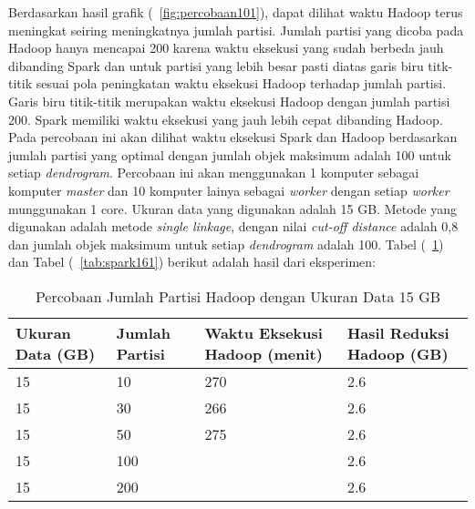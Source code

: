 Berdasarkan hasil grafik (~\ref{fig:percobaan101}), dapat dilihat waktu Hadoop terus meningkat seiring meningkatnya jumlah partisi. Jumlah partisi yang dicoba pada Hadoop hanya mencapai 200 karena waktu eksekusi yang sudah berbeda jauh dibanding Spark dan untuk partisi yang lebih besar pasti diatas garis biru titk-titik sesuai pola peningkatan waktu eksekusi Hadoop terhadap jumlah partisi. Garis biru titik-titik merupakan waktu eksekusi Hadoop dengan jumlah partisi 200. Spark memiliki waktu eksekusi yang jauh lebih cepat dibanding Hadoop.  \\





Pada percobaan ini akan dilihat waktu eksekusi Spark dan Hadoop berdasarkan jumlah partisi yang optimal dengan jumlah objek maksimum adalah 100 untuk setiap \textit{dendrogram}. Percobaan ini akan menggunakan 1 komputer sebagai komputer \textit{master} dan 10 komputer lainya sebagai \textit{worker} dengan setiap \textit{worker} munggunakan 1 core. Ukuran data yang digunakan adalah 15 GB. Metode yang digunakan adalah metode \textit{single linkage}, dengan nilai \textit{cut-off distance} adalah 0,8 dan jumlah objek maksimum untuk setiap \textit{dendrogram} adalah 100. Tabel (~\ref{tab:spark151}) dan Tabel (~\ref{tab:spark161}) berikut adalah hasil dari eksperimen:





\begin{table}[H] 
	\centering 
	\caption{Percobaan Jumlah Partisi Hadoop dengan Ukuran Data 15 GB}
	\label{tab:spark151}
	\begin{tabular}{|p{3cm}|p{3cm}|p{4cm}|p{4cm}|}
\hline
Ukuran Data (GB) & Jumlah Partisi &  Waktu Eksekusi Hadoop (menit) & Hasil Reduksi Hadoop (GB)\\
\hline
15 & 10 & 270  & 2.6  \\
\hline
15 & 30 & 266  & 2.6  \\
\hline
15 & 50 & 275  & 2.6  \\
\hline
15 & 100 &   & 2.6  \\
\hline
15 & 200 &   & 2.6  \\
\hline


\hline

	\end{tabular} 
\end{table}




